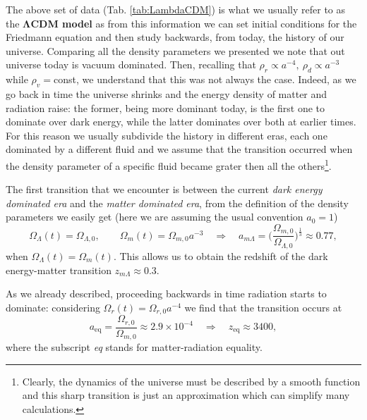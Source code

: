 The above set of data (Tab. \ref{tab:LambdaCDM}) is what we usually refer to as the $\boldsymbol{\Lambda}$\textbf{CDM model} as from this information we can set initial conditions for the Friedmann equation and then study backwards, from today, the history of our universe. Comparing all the density parameters we presented we note that out universe today is vacuum dominated. Then, recalling that $\rho_r\propto a^{-4},\ \rho_d\propto a^{-3}$ while $\rho_v=$const, we understand that this was not always the case. Indeed, as we go back in time the universe shrinks and the energy density of matter and radiation raise: the former, being more dominant today, is the first one to dominate over dark energy, while the latter dominates over both at earlier times.\\
For this reason we usually subdivide the history in different eras, each one dominated by a different fluid and we assume that the transition occurred when the density parameter of a specific fluid became grater then all the others\footnote{Clearly, the dynamics of the universe must be described by a smooth function and this sharp transition is just an approximation which can simplify many calculations.}.

The first transition that we encounter is between the current \emph{dark energy dominated era} and the \emph{matter dominated era}, from the definition of the density parameters we easily get (here we are assuming the usual convention $a_0=1$)
$$\Omega_\Lambda(t)=\Omega_{\Lambda,0},\qquad \Omega_m(t)=\Omega_{m,0}a^{-3}\quad \Rightarrow\quad a_{m\Lambda}=\bigg(\frac{\Omega_{m,0}}{\Omega_{\Lambda,0}}\bigg)^\frac{1}{3}\approx0.77,$$
when $\Omega_\Lambda(t)=\Omega_m(t)$. This allows us to obtain the redshift of the dark energy-matter transition $z_{m\Lambda}\approx0.3$.

As we already described, proceeding backwards in time radiation starts to dominate: considering $\Omega_r(t)=\Omega_{r,0}a^{-4}$ we find that the transition occurs at
$$a_\text{eq}=\frac{\Omega_{r,0}}{\Omega_{m,0}}\approx2.9\times10^{-4}\quad \Rightarrow\quad z_\text{eq}\approx3400,$$ where the subscript \emph{eq} stands for matter-radiation equality. 

